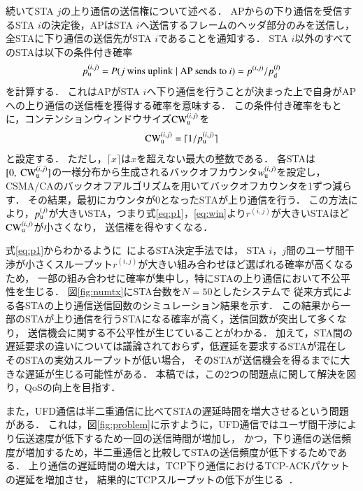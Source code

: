 \documentclass[master]{kuisthesis}		%
\newcommand{\sij}{(i,j)}
\newcommand{\pij}{p^{(i,j)}}
\newcommand{\rij}{r^{\sij}}
\begin{document}
			続いてSTA $j$の上り通信の送信権について述べる．
			APからの下り通信を受信するSTA $i$の決定後，APはSTA $i$へ送信するフレームのヘッダ部分のみを送信し，
			全STAに下り通信の送信先がSTA $i$であることを通知する．
			STA $i$以外のすべてのSTAは以下の条件付き確率
			\begin{equation}
				p_{\rm u}^{\sij} = P(j\ {\rm wins\ uplink}\mid{\rm AP\ sends\ to}\ i)=\pij / p_{\rm d}^{(i)} \label{eq:win}
			\end{equation}
			を計算する．
			これはAPがSTA $i$へ下り通信を行うことが決まった上で自身がAPへの上り通信の送信権を獲得する確率を意味する．
			この条件付き確率をもとに，コンテンションウィンドウサイズ${\rm CW}^{\sij}_{\rm u}$を
			\begin{equation}
				{\rm CW}^{\sij}_{\rm u} = \lceil 1/p_{\rm u}^{\sij} \rceil
			\end{equation}
			と設定する．
			ただし，$\lceil x \rceil$は$x$を超えない最大の整数である．
			各STAは$[0,\ {\rm CW}^{\sij}_{\rm u}]$の一様分布から生成されるバックオフカウンタ$w_{\rm u}^{\sij}$を設定し，
			CSMA/CAのバックオフアルゴリズムを用いてバックオフカウンタを1ずつ減らす．
			その結果，最初にカウンタが0となったSTAが上り通信を行う．
			この方法により，$p_{\rm u}^{(j)}$が大きいSTA，つまり式\eqref{eq:p1}，\eqref{eq:win}より$r^{\sij}$が大きいSTAほど${\rm CW}^{\sij}_{\rm u}$が小さくなり，
			送信権を得やすくなる．

			\par
			式\eqref{eq:p1}からわかるように~\cite{promac}によるSTA決定手法では，
			STA $i$，$j$間のユーザ間干渉が小さくスループット$\rij$が大きい組み合わせほど選ばれる確率が高くなるため，
			一部の組み合わせに確率が集中し，特にSTAの上り通信において不公平性を生じる．
			図\ref{fig:numtx}にSTA台数を$N=50$としたシステムで
			従来方式による各STAの上り通信送信回数のシミュレーション結果を示す．
			この結果から一部のSTAが上り通信を行うSTAになる確率が高く，送信回数が突出して多くなり，
			送信機会に関する不公平性が生じていることがわかる．
			加えて，STA間の遅延要求の違いについては議論されておらず，低遅延を要求するSTAが混在し
			そのSTAの実効スループットが低い場合，
			そのSTAが送信機会を得るまでに大きな遅延が生じる可能性がある．
			本稿では，この2つの問題点に関して解決を図り，QoSの向上を目指す．
			\par
			また，UFD通信は半二重通信に比べてSTAの遅延時間を増大させるという問題がある．
			これは，図\ref{fig:problem}に示すように，UFD通信ではユーザ間干渉により伝送速度が低下するため一回の送信時間が増加し，
			かつ，下り通信の送信頻度が増加するため，半二重通信と比較してSTAの送信頻度が低下するためである．
			上り通信の遅延時間の増大は，TCP下り通信におけるTCP-ACKパケットの遅延を増加させ，
			結果的にTCPスループットの低下が生じる~\cite{rtt}．
\end{document}
